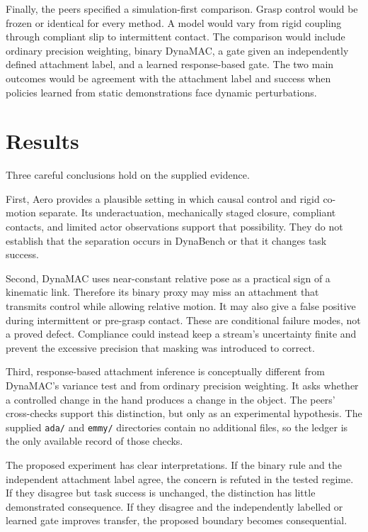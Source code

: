 \documentclass{article}
\begin{document}
Finally, the peers specified a simulation-first comparison. Grasp control would be frozen or identical for every method. A model would vary from rigid coupling through compliant slip to intermittent contact. The comparison would include ordinary precision weighting, binary DynaMAC, a gate given an independently defined attachment label, and a learned response-based gate. The two main outcomes would be agreement with the attachment label and success when policies learned from static demonstrations face dynamic perturbations.

\section{Results}

Three careful conclusions hold on the supplied evidence.

First, Aero provides a plausible setting in which causal control and rigid co-motion separate. Its underactuation, mechanically staged closure, compliant contacts, and limited actor observations support that possibility. They do not establish that the separation occurs in DynaBench or that it changes task success.

Second, DynaMAC uses near-constant relative pose as a practical sign of a kinematic link. Therefore its binary proxy may miss an attachment that transmits control while allowing relative motion. It may also give a false positive during intermittent or pre-grasp contact. These are conditional failure modes, not a proved defect. Compliance could instead keep a stream's uncertainty finite and prevent the excessive precision that masking was introduced to correct.

Third, response-based attachment inference is conceptually different from DynaMAC's variance test and from ordinary precision weighting. It asks whether a controlled change in the hand produces a change in the object. The peers' cross-checks support this distinction, but only as an experimental hypothesis. The supplied \texttt{ada/} and \texttt{emmy/} directories contain no additional files, so the ledger is the only available record of those checks.

The proposed experiment has clear interpretations. If the binary rule and the independent attachment label agree, the concern is refuted in the tested regime. If they disagree but task success is unchanged, the distinction has little demonstrated consequence. If they disagree and the independently labelled or learned gate improves transfer, the proposed boundary becomes consequential.
\end{document}
